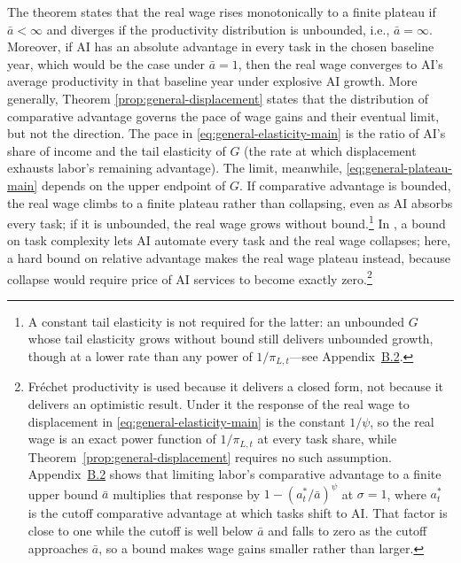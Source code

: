 \documentclass[11pt]{article}
\begin{document}
The theorem states that the real wage rises monotonically to a finite
plateau if $\bar{a}<\infty$ and diverges if the productivity distribution
is unbounded, i.e., $\bar{a}=\infty$. Moreover, if AI has an absolute
advantage in every task in the chosen baseline year, which would be
the case under $\bar{a}=1$, then the real wage converges to AI's
average productivity in that baseline year under explosive AI growth.
More generally, Theorem \ref{prop:general-displacement} states that
the distribution of comparative advantage governs the pace of wage
gains and their eventual limit, but not the direction. The pace in
\eqref{eq:general-elasticity-main} is the ratio of AI's share of
income and the tail elasticity of $G$ (the rate at which displacement
exhausts labor's remaining advantage). The limit, meanwhile, \eqref{eq:general-plateau-main}
depends on the upper endpoint of $G$. If comparative advantage is
bounded, the real wage climbs to a finite plateau rather than collapsing,
even as AI absorbs every task; if it is unbounded, the real wage grows
without bound.\footnote{A constant tail elasticity is not required for the latter: an unbounded
$G$ whose tail elasticity grows without bound still delivers unbounded
growth, though at a lower rate than any power of $1/\pi_{L,t}$---see
Appendix~\href{https://ahmadlp.github.io/Lashkaripour_AI_Displacement_Online_Appendix.pdf\#page=15}{B.2}.} In \citet{ks2024}, a bound on task complexity lets AI automate every
task and the real wage collapses; here, a hard bound on relative advantage
makes the real wage plateau instead, because collapse would require
price of AI services to become exactly zero.\footnote{Fréchet productivity is used because it delivers a closed form, not
because it delivers an optimistic result. Under it the response of
the real wage to displacement in \eqref{eq:general-elasticity-main}
is the constant $1/\psi$, so the real wage is an exact power function
of $1/\pi_{L,t}$ at every task share, while Theorem~\ref{prop:general-displacement}
requires no such assumption. Appendix~\href{https://ahmadlp.github.io/Lashkaripour_AI_Displacement_Online_Appendix.pdf\#page=15}{B.2}
shows that limiting labor's comparative advantage to a finite upper
bound $\bar{a}$ multiplies that response by $1-(a^{*}_{t}/\bar{a})^{\psi}$
at $\sigma=1$, where $a^{*}_{t}$ is the cutoff comparative advantage
at which tasks shift to AI. That factor is close to one while the
cutoff is well below $\bar{a}$ and falls to zero as the cutoff approaches
$\bar{a}$, so a bound makes wage gains smaller rather than larger.}
\end{document}
